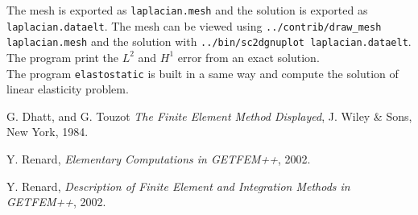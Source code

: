 \documentclass[11pt,a4paper]{article}
\begin{document}
The mesh is exported as {\tt laplacian.mesh} and the solution is exported as {\tt laplacian.dataelt}. The mesh can be viewed using {\tt ../contrib/draw\_mesh laplacian.mesh} and the solution with {\tt ../bin/sc2dgnuplot laplacian.dataelt}. The program print the $L^2$ and $H^1$ error from an exact solution.\\[0.5cm]
The program {\tt elastostatic} is built in a same way and compute the solution of linear elasticity problem.

\begin{thebibliography}{99}
% 
% 
% 
  G. {\sc Dhatt, and  G. Touzot}
  {\it The Finite Element Method Displayed}, 
 J. Wiley \& Sons,  New York, 1984.

  Y. {\sc Renard},
  {\it Elementary Computations in GETFEM++}, 2002.

  Y. {\sc Renard},
  {\it Description of Finite Element and Integration Methods in GETFEM++}, 2002.

\end{thebibliography}
\end{document}
